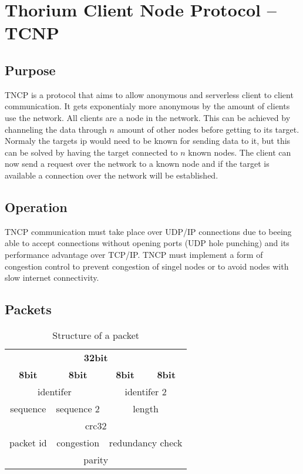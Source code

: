 \section{Thorium Client Node Protocol -- TCNP}
\subsection{Purpose}
TNCP is a protocol that aims to allow anonymous and serverless client to client communication. It gets exponentialy more anonymous by the amount of clients use the network. All clients are a node in the network.
This can be achieved by channeling the data through $ n $ amount of other nodes before getting to its target. Normaly the targets ip would need to be known for sending data to it, but this can be solved by having the target connected to $ n $ known nodes. The client can now send a request over the network to a known node and if the target is available a connection over the network will be established.
\subsection{Operation}
TNCP communication must take place over UDP/IP connections due to beeing able to accept connections without opening ports (UDP hole punching) and its performance advantage over TCP/IP.
TNCP must implement a form of congestion control to prevent congestion of singel nodes or to avoid nodes with slow internet connectivity.
\subsection{Packets}
\begin{table}[h!]
	\begin{center}
		\caption{Structure of a packet}
		\begin{tabular}{|c|c|c|c|}
			\multicolumn{4}{c}{\textbf{32bit}} \\ 
			\textbf{8bit} & \textbf{8bit} & \textbf{8bit} & \textbf{8bit} \\
			\multicolumn{2}{|c|}{identifer} & \multicolumn{2}{c|}{identifer 2} \\
			\hline
			sequence & sequence 2 & \multicolumn{2}{c|}{length} \\
			\hline
			\multicolumn{4}{|c|}{crc32} \\
			\hline
			packet id & congestion & \multicolumn{2}{c|}{redundancy check} \\
			\hline
			\multicolumn{4}{|c|}{parity} \\
		\end{tabular}
	\end{center}
\end{table}